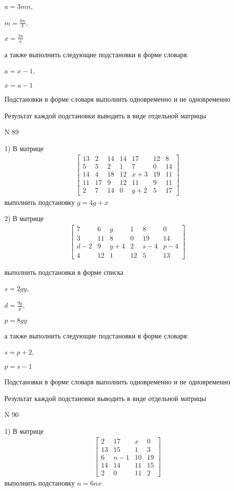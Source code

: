 \documentclass[11pt]{report}
\begin{document}
$a=3 m n$,

$m=\frac{6 n}{k}$,

$x=\frac{2 n}{x}$

а также выполнить следующие подстановки в форме словаря:

$a=x - 1$,

$x=a - 1$


    Подстановки в форме словаря выполнить одновременно и не одновременно


    Результат каждой подстановки выводить в виде отдельной матрицы

\newpage
N 89


    1) В матрице
\begin{align*}
\left[\begin{matrix}13 & 2 & 14 & 14 & 17 & 12 & 8\\5 & 5 & 2 & 1 & 7 & 0 & 14\\14 & 4 & 18 & 12 & x + 3 & 19 & 11\\11 & 17 & 9 & 12 & 11 & 9 & 11\\2 & 7 & 14 & 0 & g + 2 & 5 & 17\end{matrix}\right]
\end{align*}
выполнить подстановку $g=4 g + x$


    2) В матрице
\begin{align*}
\left[\begin{matrix}7 & 6 & g & 1 & 8 & 0\\3 & 11 & 8 & 0 & 19 & 14\\d - 2 & 9 & y + 4 & 2 & s - 4 & p - 4\\4 & 12 & 1 & 12 & 5 & 13\end{matrix}\right]
\end{align*}

выполнить подстановки в форме списка

$s=2 g y$,

$d=\frac{9 g}{p}$,

$p=8 g y$

а также выполнить следующие подстановки в форме словаря:

$s=p + 2$,

$p=s - 1$


    Подстановки в форме словаря выполнить одновременно и не одновременно


    Результат каждой подстановки выводить в виде отдельной матрицы

\newpage
N 90


    1) В матрице
\begin{align*}
\left[\begin{matrix}2 & 17 & x & 0\\13 & 15 & 1 & 3\\6 & n - 1 & 10 & 19\\14 & 14 & 11 & 15\\2 & 0 & 11 & 2\end{matrix}\right]
\end{align*}
выполнить подстановку $n=6 n x$
\end{document}
